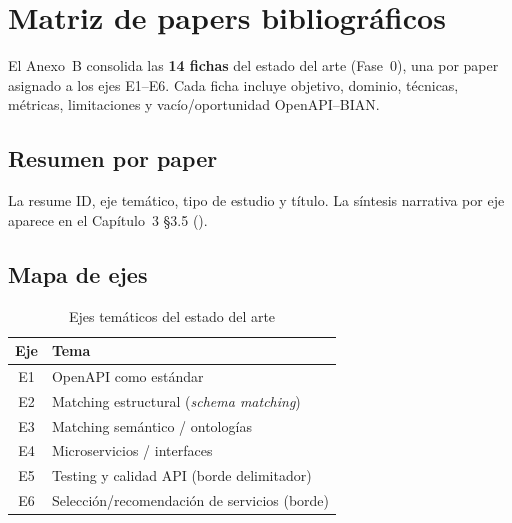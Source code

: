 \chapter{Matriz de papers bibliográficos}
\label{anexo:b}

El Anexo~B consolida las \textbf{14 fichas} del estado del arte (Fase~0), una por paper
asignado a los ejes E1--E6. Cada ficha incluye objetivo, dominio, técnicas, métricas,
limitaciones y vacío/oportunidad OpenAPI--BIAN.

\section{Resumen por paper}

La  resume ID, eje temático, tipo de estudio y título. La síntesis narrativa
por eje aparece en el Capítulo~3 §3.5 ().

\small

\normalsize

\section{Mapa de ejes}

\begin{table}[H]
  \centering
  \caption{Ejes temáticos del estado del arte}
  \label{tab:anexo-b-ejes}
  \small
  \begin{tabular}{@{}cl@{}}
    \toprule
    \textbf{Eje} & \textbf{Tema} \\
    \midrule
    E1 & OpenAPI como estándar \\
    E2 & Matching estructural (\textit{schema matching}) \\
    E3 & Matching semántico / ontologías \\
    E4 & Microservicios / interfaces \\
    E5 & Testing y calidad API (borde delimitador) \\
    E6 & Selección/recomendación de servicios (borde) \\
    \bottomrule
  \end{tabular}
\end{table}
